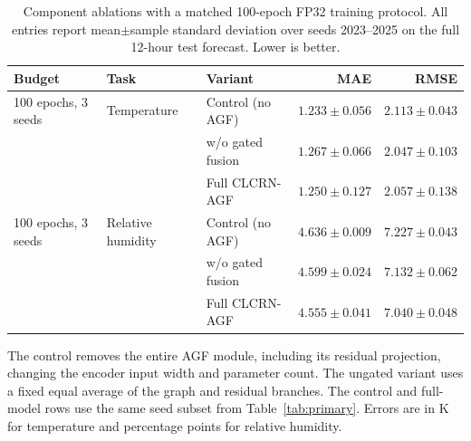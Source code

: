 \begin{table}[htbp]
\caption{Component ablations with a matched 100-epoch FP32 training protocol. All entries report mean$\pm$sample standard deviation over seeds 2023--2025 on the full 12-hour test forecast. Lower is better.}
\label{tab:ablation}
\centering
\small
\begin{tabular}{lllrr}
\toprule
Budget & Task & Variant & MAE & RMSE\\
\midrule
100 epochs, 3 seeds & Temperature & Control (no AGF) & $1.233\pm0.056$ & $2.113\pm0.043$ \\
 &  & w/o gated fusion & $1.267\pm0.066$ & $2.047\pm0.103$ \\
 &  & Full CLCRN-AGF & $1.250\pm0.127$ & $2.057\pm0.138$ \\
\midrule
100 epochs, 3 seeds & Relative humidity & Control (no AGF) & $4.636\pm0.009$ & $7.227\pm0.043$ \\
 &  & w/o gated fusion & $4.599\pm0.024$ & $7.132\pm0.062$ \\
 &  & Full CLCRN-AGF & $4.555\pm0.041$ & $7.040\pm0.048$ \\
\bottomrule
\end{tabular}
\vspace{2pt}\par\parbox{\linewidth}{\footnotesize The control removes the entire AGF module, including its residual projection, changing the encoder input width and parameter count. The ungated variant uses a fixed equal average of the graph and residual branches. The control and full-model rows use the same seed subset from Table~\ref{tab:primary}. Errors are in K for temperature and percentage points for relative humidity.}
\end{table}
